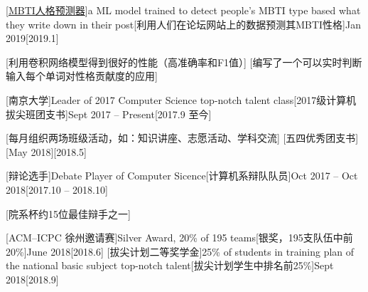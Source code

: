 \documentclass[language=chinese]{bilingualcv}
\begin{document}
\begin{project}
    [\href{https://github.com/zhengzangw/ml-winter-camp}{MBTI人格预测器}]{a ML model trained to detect people's MBTI type based what they write down in their post}[利用人们在论坛网站上的数据预测其MBTI性格]{Jan 2019}[2019.1]
    \begin{detail}
        [利用卷积网络模型得到很好的性能（高准确率和F1值）]
        [编写了一个可以实时判断输入每个单词对性格贡献度的应用]
    \end{detail}

\end{project}
\begin{skill}
\end{skill}
\begin{leadership}
    [南京大学]{Leader of 2017 Computer Science top-notch talent class}[2017级计算机拔尖班团支书]{Sept 2017 -- Present}[2017.9 至今]
    \begin{detail}
        [每月组织两场班级活动，如：知识讲座、志愿活动、学科交流]
        [五四优秀团支书][May 2018][2018.5]
    \end{detail}
\end{leadership}
\begin{activity}
    [辩论选手]{Debate Player of Computer Sicence}[计算机系辩队队员]{Oct 2017 -- Oct 2018}[2017.10 -- 2018.10]
    \begin{detail}
        [院系杯约15位最佳辩手之一]
    \end{detail}
\end{activity}
\begin{honor}
    [ACM--ICPC 徐州邀请赛]{Silver Award, 20\% of 195 teams}[银奖，195支队伍中前20\%]{June 2018}[2018.6]
    [拔尖计划二等奖学金]{25\% of students in training plan of the national basic subject top-notch talent}[拔尖计划学生中排名前25\%]{Sept 2018}[2018.9]
\end{honor}
\makedate
\end{document}
